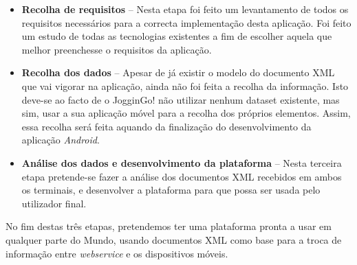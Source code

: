 \documentclass[twocolumn,twoside,10pt,a4paper]{article}
\begin{document}
\begin{itemize}
\item \textbf{Recolha de requisitos} -- Nesta etapa foi feito um levantamento de todos os requisitos necessários para a correcta implementação desta aplicação. Foi feito um estudo de todas as tecnologias existentes a fim de escolher aquela que melhor preenchesse o requisitos da aplicação.
\item \textbf{Recolha dos dados} -- Apesar de já existir o modelo do documento XML que vai vigorar na aplicação, ainda não foi feita a recolha da informação. Isto deve-se ao facto de o JogginGo! não utilizar nenhum dataset existente, mas sim, usar a sua aplicação móvel para a recolha dos próprios elementos. Assim, essa recolha será feita aquando da finalização do desenvolvimento  da aplicação \textit{Android}.
\item \textbf{Análise dos dados e desenvolvimento da plataforma}  -- Nesta terceira etapa pretende-se fazer a análise dos documentos XML recebidos em ambos os terminais, e desenvolver a plataforma para que possa ser usada pelo utilizador final.
\end{itemize}

No fim destas três etapas, pretendemos ter uma plataforma pronta a usar em qualquer parte do Mundo, usando documentos XML como base para a troca de informação entre 	\textit{webservice} e os dispositivos móveis.


\nocite{*}
\renewcommand{\bibname}{Referências}
%
%

%
{}
\end{document}
